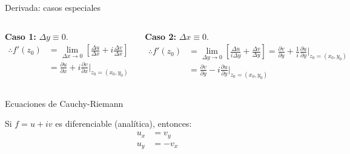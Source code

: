 \documentclass[9pt, aspectratio=169]{beamer}
\begin{document}
\begin{frame}{Derivada: casos especiales}
 \begin{columns}[t]
  \textbf{Caso 1:} $\Delta y \equiv 0$.
  \begin{align*}
   \therefore f'(z_0) &= \lim_{\Delta x \rightarrow 0} \left[ \frac{\Delta u}{\Delta x} + i \frac{\Delta v}{\Delta x} \right] \\
   &= \frac{\partial u}{\partial x} + i \frac{\partial v}{\partial x} \biggr\rvert_{z_0 = (x_0, y_0)}
  \end{align*} \pause

  \textbf{Caso 2:} $\Delta x \equiv 0$.
  \begin{align*}
   \therefore f'(z_0) &= \lim_{\Delta y \rightarrow 0} \left[ \frac{\Delta u}{i \Delta y} +  \frac{\Delta v}{\Delta y} \right] = \frac{\partial v}{\partial y} + \frac{1}{i} \frac{\partial u}{\partial y} \biggr\rvert_{z_0 = (x_0, y_0)} \\
   &= \frac{\partial v}{\partial y} - i \frac{\partial u}{\partial y} \biggr\rvert_{z_0 = (x_0, y_0)}
  \end{align*} \pause
 \end{columns}
 \vspace{2em}
 
 \begin{block}{Ecuaciones de Cauchy-Riemann}
 \begin{center}
  Si $f = u + i v$ es diferenciable (\alert{analítica}), entonces:
  \begin{align*}
    u_x &= v_y \\
    u_y &= -v_x
  \end{align*}
  \end{center}
 \end{block}
\end{frame}
\end{document}
